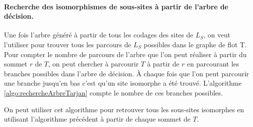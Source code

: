 \paragraph{Recherche des isomorphismes de sous-sites à partir de l'arbre de décision.}
Une fois l'arbre généré à partir de tous les codages des sites de $L_S$, on veut l'utiliser pour trouver tous les parcours de $L_S$ possibles dans le graphe de flot T. Pour compter le nombre de parcours de l'arbre que l'on peut réaliser à partir du sommet $r$ de $T$, on peut chercher à parcourir $T$ à partir de $r$ en parcourant les branches possibles dans l'arbre de décision. À chaque fois que l'on peut parcourir une branche jusqu'en bas c'est qu'un site isomorphe a été trouvé. L'algorithme \ref{algo:rechercheArbreTarjan} compte le nombre de ces branches possibles.

On peut utiliser cet algorithme pour retrouver tous les sous-sites isomorphes en utilisant l'algorithme précédent à partir de chaque sommet de $T$.

